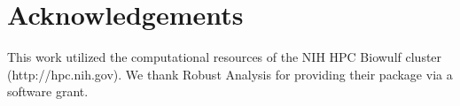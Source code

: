 \section*{Acknowledgements}
This work utilized the computational resources of the NIH HPC Biowulf
cluster (http://hpc.nih.gov).  We thank Robust Analysis for providing
their   package via a software grant. 





%
%
%
%



\address{Bruce J. Swihart\\
  National Institutes of Health \\
  National Institute of Allergy and Infectious Diseases\\
  5601 Fishers Lane Baltimore MD, 20852\\
  United States of America\\
  (ORCiD 0000-0002-4216-9942)\\
  }

\address{John P. Nolan\\
  American University\\
  Department of Math \& Statistics \\
  4400 Mass. Ave, Washington DC 20016 \\
  United States of America\\
  (ORCiD 0000-0002-9669-382X)\\
  }

